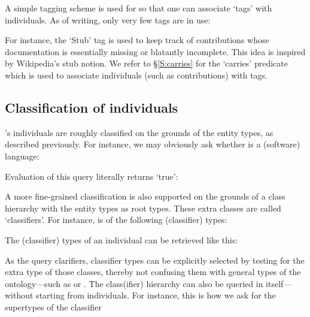A simple tagging scheme is used for \solasote{} so that one can
associate `tags' with individuals. As of writing, only very few tags
are in use:


\noindent
For instance, the `Stub' tag is used to keep track of contributions
whose documentation is essentially missing or blatantly
incomplete. This idea is inspired by Wikipedia's stub notion. We refer
to \S\ref{S:carries} for the `carries' predicate which is used to
associate individuals (such as contributions) with tags.


\subsection{Classification of individuals}
\label{S:classify}

\solasote's individuals are roughly classified on the grounds of the
entity types, as described previously. For instance, we may obviously
ask whether  is a (software) language:


\noindent
Evaluation of this query literally returns `true':


\noindent
A more fine-grained classification is also supported on the grounds of a class hierarchy with the entity types as root types. These extra classes are called `classifiers'. For instance,  is of the following (classifier) types:


\noindent
The (classifier) types of an individual can be retrieved like this:


\noindent
As the query clarifiers, classifier types can be explicitly selected by testing for the extra type  of those classes, thereby not confusing them with general types of the ontology---such as  or . The class(ifier) hierarchy can also be queried in itself---without starting from individuals. For instance, this is how we ask for the supertypes of the classifier



